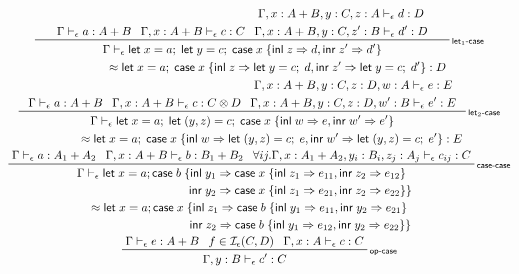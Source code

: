 \documentclass[acmsmall,screen,review]{acmart}
\newcommand{\mc}[1]{\ensuremath{\mathcal{#1}}}
\newcommand{\ms}[1]{\ensuremath{\mathsf{#1}}}
\newcommand{\lto}{\Rightarrow}
\newcommand{\linl}[1]{\ms{inl}\;{#1}}
\newcommand{\linr}[1]{\ms{inr}\;{#1}}
\newcommand{\letexpr}[3]{\ensuremath{\ms{let}\;#1 = #2;\;#3}}
\newcommand{\caseexpr}[5]{\ms{case}\;#1\;\{\linl{#2} \lto #3, \linr{#4} \lto #5\}}
\newcommand{\bhyp}[2]{#1 : #2}
\newcommand{\rle}[1]{{\scriptsize\textsf{#1}}}
\newcommand{\hasty}[4]{#1 \vdash_{#2} #3: {#4}}
\newcommand{\isop}[4]{#1 \in \mc{I}_{#4}(#2, #3)}
\newcommand{\teqv}{\approx}
\begin{document}
\begin{gather*}
  \prftree[r]{\rle{let$_1$-case}}
    {\hasty{\Gamma}{\epsilon}{a}{A + B}}
    {\hasty{\Gamma, \bhyp{x}{A + B}}{\epsilon}{c}{C}}
    {
      \prfStackPremises
      {\hasty{\Gamma, \bhyp{x}{A + B}, \bhyp{y}{C}, \bhyp{z}{A}}{\epsilon}{d}{D}}
      {\hasty{\Gamma, \bhyp{x}{A + B}, \bhyp{y}{C}, \bhyp{z'}{B}}{\epsilon}{d'}{D}}
    }
    {
      \prfStackPremises
      {\Gamma \vdash_\epsilon \letexpr{x}{a}{\letexpr{y}{c}{\caseexpr{x}{z}{d}{z'}{d'}}}}
      {\hspace{6em} \teqv \letexpr{x}{a}{\caseexpr{x}{z}{\letexpr{y}{c}{d}}{z'}{\letexpr{y}{c}{d'}}} 
      : D}
    }
  \\
  \prftree[r]{\rle{let$_2$-case}}
    {\hasty{\Gamma}{\epsilon}{a}{A + B}}
    {\hasty{\Gamma, \bhyp{x}{A + B}}{\epsilon}{c}{C \otimes D}}
    {
      \prfStackPremises
      {\hasty{\Gamma, \bhyp{x}{A + B}, \bhyp{y}{C}, \bhyp{z}{D}, \bhyp{w}{A}}{\epsilon}{e}{E}}
      {\hasty{\Gamma, \bhyp{x}{A + B}, \bhyp{y}{C}, \bhyp{z}{D}, \bhyp{w'}{B}}{\epsilon}{e'}{E}}
    }
    {
      \prfStackPremises
      {\Gamma \vdash_\epsilon \letexpr{x}{a}{\letexpr{(y, z)}{c}{\caseexpr{x}{w}{e}{w'}{e'}}}}
      {\hspace{5em} \teqv \letexpr{x}{a}
        {\caseexpr{x}
          {w}{\letexpr{(y, z)}{c}{e}}
          {w'}{\letexpr{(y, z)}{c}{e'}}} 
      : E}
    }
  \\
  \prftree[r]{\rle{case-case}}
    {\hasty{\Gamma}{\epsilon}{a}{A_1 + A_2}}
    {\hasty{\Gamma, \bhyp{x}{A + B}}{\epsilon}{b}{B_1 + B_2}}
    {
      \forall i j.
      \hasty{\Gamma, \bhyp{x}{A_1 + A_2}, \bhyp{y_i}{B_i}, \bhyp{z_j}{A_j}}{\epsilon}
            {c_{ij}}{C}
    }
    {
      \prfStackPremises
      {\Gamma \vdash_\epsilon 
        \ms{let}\;x = a;
        \ms{case}\;b\;\{\ms{inl}\;y_1 \Rightarrow \caseexpr{x}{z_1}{e_{11}}{z_2}{e_{12}}
      }
      {
        \hspace{10em} \ms{inr}\;y_2 \Rightarrow \caseexpr{x}{z_1}{e_{21}}{z_2}{e_{22}} \}
      }
      {\hspace{1.3em} \teqv
        \ms{let}\;x = a;
        \ms{case}\;x\;\{\ms{inl}\;z_1 \Rightarrow \caseexpr{b}{y_1}{e_{11}}{y_2}{e_{21}}
      }
      {
        \hspace{10em} \ms{inr}\;z_2 \Rightarrow \caseexpr{b}{y_1}{e_{12}}{y_2}{e_{22}} \}
      }
    }
  \\
  \prftree[r]{\rle{op-case}}
    {\hasty{\Gamma}{\epsilon}{e}{A + B}}
    {\isop{f}{C}{D}{\epsilon}}
    {\hasty{\Gamma, \bhyp{x}{A}}{\epsilon}{c}{C}}
    {\hasty{\Gamma, \bhyp{y}{B}}{\epsilon}{c'}{C}}

\end{gather*}
\end{document}
